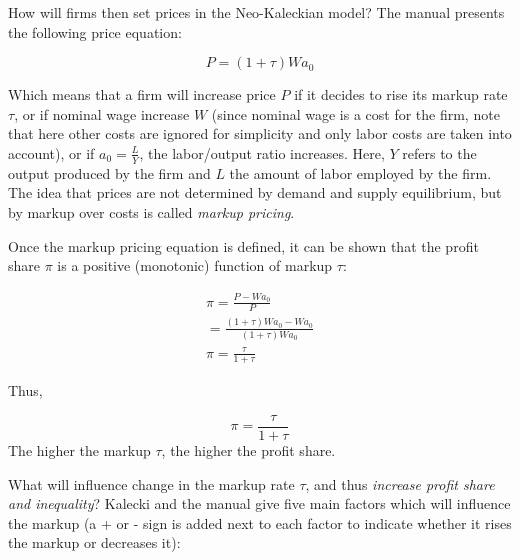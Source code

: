\documentclass[
  letterpaper,
  DIV=11,
  numbers=noendperiod]{scrreprt}
\begin{document}
How will firms then set prices in the Neo-Kaleckian model? The manual
presents the following price equation:

\[P = (1 + \tau)Wa_0\]

Which means that a firm will increase price \(P\) if it decides to rise
its markup rate \(\tau\), or if nominal wage increase \(W\) (since
nominal wage is a cost for the firm, note that here other costs are
ignored for simplicity and only labor costs are taken into account), or
if \(a_0 = \frac{L}{Y}\), the labor/output ratio increases. Here, \(Y\)
refers to the output produced by the firm and \(L\) the amount of labor
employed by the firm. The idea that prices are not determined by demand
and supply equilibrium, but by markup over costs is called \emph{markup
pricing}.

Once the markup pricing equation is defined, it can be shown that the
profit share \(\pi\) is a positive (monotonic) function of markup
\(\tau\):

\[
\begin{aligned}
\pi = \frac{P - Wa_0}{P}
\\
= \frac{(1+\tau)Wa_0-Wa_0}{(1+\tau)Wa_0}
\\
\pi = \frac{\tau}{1+\tau}
\end{aligned}
\]

Thus,

\[\pi = \frac{\tau}{1+\tau}\] The higher the markup \(\tau\), the higher
the profit share.

What will influence change in the markup rate \(\tau\), and thus
\emph{increase profit share and inequality}? Kalecki and the manual give
five main factors which will influence the markup (a + or - sign is
added next to each factor to indicate whether it rises the markup or
decreases it):
\end{document}
